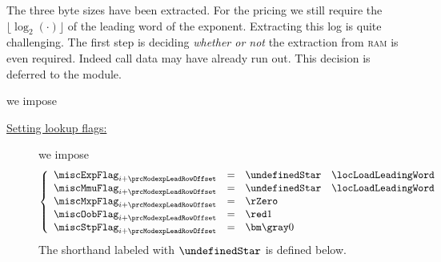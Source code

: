 	The three byte sizes have been extracted.
	For the pricing we still require the $\lfloor\log_{2}(\cdot)\rfloor$ of the leading word of the exponent.
	Extracting this log is quite challenging.
	The first step is deciding \emph{whether or not} the extraction from \textsc{ram} is even required.
	Indeed call data may have already run out.
	This decision is deferred to the \oobMod{} module.
	\begin{description}
		\def\rowNum{\yellowm{5}} \item[\underline{\underline{Miscellaneous row $n^°(i + \prcModexpLeadRowOffset)$:}}] we impose 
			\begin{description}
				\item[\underline{Setting lookup flags:}]
					we impose
					\[
						\left\{ \begin{array}{lclr}
							\miscExpFlag _{i + \prcModexpLeadRowOffset} & = & \undefinedStar \quad \locLoadLeadingWord \\
							\miscMmuFlag _{i + \prcModexpLeadRowOffset} & = & \undefinedStar \quad \locLoadLeadingWord \\
							\miscMxpFlag _{i + \prcModexpLeadRowOffset} & = & \rZero                                   \\
							\miscOobFlag _{i + \prcModexpLeadRowOffset} & = & \one                                     \\
							\miscStpFlag _{i + \prcModexpLeadRowOffset} & = & \gZero                                   \\
						\end{array} \right.
					\]
					\saNote{}
					The shorthand \locLoadLeadingWord{} labeled with $\undefinedStar$ is defined below.


\end{description}
\end{description}
